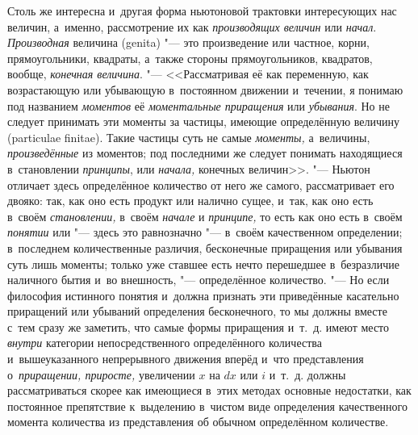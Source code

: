 Столь же интересна и~другая форма ньютоновой трактовки интересующих нас
величин, а~именно, рассмотрение их как {\em производящих величин} или
{\em начал}. {\em Производная} величина (genita) "--- это произведение или
частное, корни, прямоугольники, квадраты, а~также стороны прямоугольников,
квадратов, вообще, {\em конечная величина}. "--- <<Рассматривая её как
переменную, как возрастающую или убывающую в~постоянном движении и~течении,
я понимаю под названием {\em моментов} её {\em моментальные приращения} или
{\em убывания}. Но не следует принимать эти моменты за частицы, имеющие
определённую величину (particulae finitae). Такие частицы суть не самые
{\em моменты,} а~величины, {\em произведённые} из моментов; под последними же
следует понимать находящиеся в~становлении {\em принципы}, или {\em начала,}
конечных величин>>. "--- Ньютон отличает здесь определённое количество от него
же самого, рассматривает его двояко: так, как оно есть продукт или налично
сущее, и~так, как оно есть в~своём {\em становлении,} в~своём {\em начале} и
{\em принципе,} то есть как оно есть в~своём {\em понятии} или "--- здесь это
равнозначно "--- в~своём качественном определении; в~последнем количественные
различия, бесконечные приращения или убывания суть лишь моменты; только уже
ставшее есть нечто перешедшее в~безразличие наличного бытия и~во внешность,
"--- определённое количество. "--- Но если философия истинного понятия и~должна
признать эти приведённые касательно приращений или убываний определения
бесконечного, то мы должны вместе с~тем сразу же заметить, что самые формы
приращения и~т.~д. имеют место {\em внутри} категории непосредственного
определённого количества и~вышеуказанного непрерывного движения вперёд и~что
представления о~{\em приращении, приросте,} увеличении $x$ на
$dx$ или $i$ и~т.~д. должны рассматриваться скорее как имеющиеся в~этих
методах основные недостатки, как постоянное препятствие к~выделению в~чистом
виде определения качественного момента количества из представления об обычном
определённом количестве.

